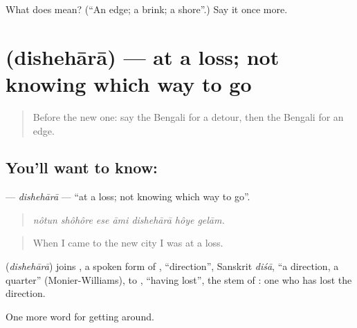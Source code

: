 \begin{tcolorbox}[breakable,colback=teal!4,colframe=teal!35!black,title={Before you move on}]
What does  mean? (\textquotedblleft{}An edge; a brink; a shore\textquotedblright{}.) Say it once more.
\end{tcolorbox}
\section[\texorpdfstring{\bn{দিশেহারা} (dishehārā)}{দিশেহারা (dishehārā)}]{ (dishehārā) — at a loss; not knowing which way to go}

\label{lesson:BN-C402-dishehara}



\begin{quote}
Before the new one: say the Bengali for a detour, then the Bengali for an edge.
\end{quote}

\subsection*{You'll want to know: }
\textbf{} — \emph{dishehārā} — \textquotedblleft{}at a loss; not knowing which way to go\textquotedblright{}.

\begin{quote}
      
\end{quote}

\begin{quote}
\emph{nôtun shôhôre ese āmi dishehārā hôye gelām.}
\end{quote}

\begin{quote}
When I came to the new city I was at a loss.
\end{quote}

\begin{cousinweb}
\textbf{} (\emph{dishehārā}) joins , a spoken form of , \textquotedblleft{}direction\textquotedblright{}, Sanskrit \emph{diśā}, \textquotedblleft{}a direction, a quarter\textquotedblright{} (Monier-Williams), to , \textquotedblleft{}having lost\textquotedblright{}, the stem of : one who has lost the direction.
\end{cousinweb}

\begin{grammarlens}[title={What you've built}]
One more word for getting around.
\end{grammarlens}

